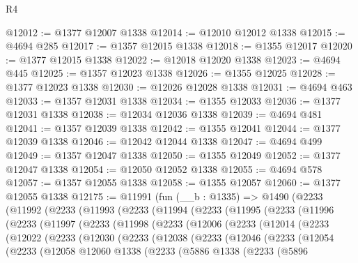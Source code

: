 \begin{lexlean}{R4}
\begin{coremodule}
@12012 := @1377 @12007 @1338
@12014 := @12010 @12012 @1338
@12015 := @4694 @285
@12017 := @1357 @12015 @1338
@12018 := @1355 @12017
@12020 := @1377 @12015 @1338
@12022 := @12018 @12020 @1338
@12023 := @4694 @445
@12025 := @1357 @12023 @1338
@12026 := @1355 @12025
@12028 := @1377 @12023 @1338
@12030 := @12026 @12028 @1338
@12031 := @4694 @463
@12033 := @1357 @12031 @1338
@12034 := @1355 @12033
@12036 := @1377 @12031 @1338
@12038 := @12034 @12036 @1338
@12039 := @4694 @481
@12041 := @1357 @12039 @1338
@12042 := @1355 @12041
@12044 := @1377 @12039 @1338
@12046 := @12042 @12044 @1338
@12047 := @4694 @499
@12049 := @1357 @12047 @1338
@12050 := @1355 @12049
@12052 := @1377 @12047 @1338
@12054 := @12050 @12052 @1338
@12055 := @4694 @578
@12057 := @1357 @12055 @1338
@12058 := @1355 @12057
@12060 := @1377 @12055 @1338
@12175 := @11991
    (fun (__b : @1335) =>
    @1490
      (@2233
        (@11992
          (@2233
            (@11993
              (@2233
                (@11994
                  (@2233
                    (@11995
                      (@2233
                        (@11996
                          (@2233
                            (@11997
                              (@2233
                                (@11998
                                  (@2233
                                    (@12006
                                      (@2233
                                        (@12014
                                          (@2233
                                            (@12022
                                              (@2233
                                                (@12030
                                                  (@2233
                                                    (@12038
                                                      (@2233
                                                        (@12046
                                                          (@2233
                                                            (@12054
                                                              (@2233
                                                                (@12058
                                                                  @12060
                                                                  @1338
                                                                  (@2233
                                                                    (@5886
                                                                      @1338
                                                                      (@2233
                                                                        (@5896

\end{coremodule}
\end{lexlean}
